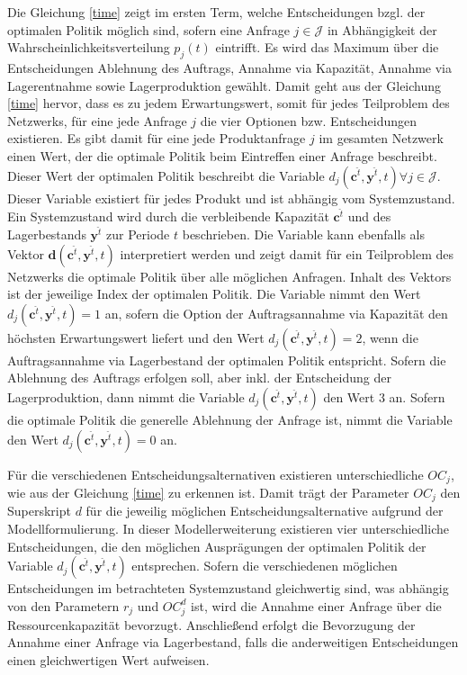 Die Gleichung \eqref{time} zeigt im ersten Term, welche Entscheidungen bzgl. der optimalen Politik möglich sind, sofern eine Anfrage $j\in\mathcal J$ in Abhängigkeit der Wahrscheinlichkeitsverteilung $p_j(t)$ eintrifft. Es wird das Maximum über die Entscheidungen \glqq Ablehnung des Auftrags{\grqq}, \glqq Annahme via Kapazität{\grqq}, \glqq Annahme via Lagerentnahme{\grqq} sowie \glqq Lagerproduktion{\grqq} gewählt. Damit geht aus der Gleichung \eqref{time} hervor, dass es zu jedem Erwartungswert, somit für jedes Teilproblem des Netzwerks, für eine jede Anfrage $j$ die vier Optionen bzw. Entscheidungen existieren. Es gibt damit für eine jede Produktanfrage $j$ im gesamten Netzwerk einen Wert, der die optimale Politik beim Eintreffen einer Anfrage beschreibt. Dieser Wert der optimalen Politik beschreibt die Variable $d_j({\textbf{c}^{\hat t},\textbf{y}^{\hat t},t})\forall j\in\mathcal{J}$. Dieser Variable existiert für jedes Produkt und ist abhängig vom Systemzustand. Ein Systemzustand wird durch die verbleibende Kapazität $\textbf{c}^{\hat t}$ und des Lagerbestands $\textbf{y}^{\hat t}$ zur Periode $t$ beschrieben. Die Variable kann ebenfalls als Vektor $\textbf{d}({\textbf{c}^{\hat t},\textbf{y}^{\hat t},t})$ interpretiert werden und zeigt damit für ein Teilproblem des Netzwerks die optimale Politik über alle möglichen Anfragen. Inhalt des Vektors ist der jeweilige Index der optimalen Politik. Die Variable nimmt den Wert $d_j({\textbf{c}^{\hat t},\textbf{y}^{\hat t},t})=1$ an, sofern die Option der Auftragsannahme via Kapazität den höchsten Erwartungswert liefert und den Wert $d_j({\textbf{c}^{\hat t},\textbf{y}^{\hat t},t})=2$, wenn die Auftragsannahme via Lagerbestand der optimalen Politik entspricht. Sofern die Ablehnung des Auftrags erfolgen soll, aber inkl. der Entscheidung der Lagerproduktion, dann nimmt die Variable $d_j({\textbf{c}^{\hat t},\textbf{y}^{\hat t},t})$ den Wert $3$ an. Sofern die optimale Politik die generelle Ablehnung der Anfrage ist, nimmt die Variable den Wert $d_j({\textbf{c}^{\hat t},\textbf{y}^{\hat t},t})=0$ an.

Für die verschiedenen Entscheidungsalternativen existieren unterschiedliche $OC_{j}$, wie aus der Gleichung \eqref{time} zu erkennen ist. Damit trägt der Parameter $OC_{j}$ den Superskript $d$ für die jeweilig möglichen Entscheidungsalternative aufgrund der Modellformulierung. In dieser Modellerweiterung existieren vier unterschiedliche Entscheidungen, die den möglichen Ausprägungen der optimalen Politik der Variable $d_{j}(\textbf{c}^{\hat t},\textbf{y}^{\hat t},t)$ entsprechen. Sofern die verschiedenen möglichen Entscheidungen im betrachteten Systemzustand gleichwertig sind, was abhängig von den Parametern $r_{j}$ und $OC_j^{d}$ ist, wird die Annahme einer Anfrage über die Ressourcenkapazität bevorzugt. Anschließend erfolgt die Bevorzugung der Annahme einer Anfrage via Lagerbestand, falls die anderweitigen Entscheidungen einen gleichwertigen Wert aufweisen.

